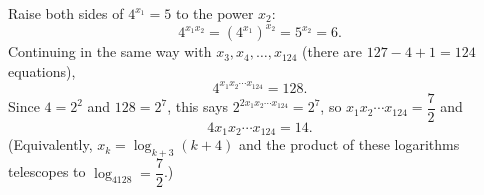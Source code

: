 Raise both sides of $4^{x_1}=5$ to the power $x_2$:
\[4^{x_1x_2}=\left(4^{x_1}\right)^{x_2}=5^{x_2}=6 .\]
Continuing in the same way with $x_3,x_4,\dots,x_{124}$ (there are $127-4+1=124$ equations),
\[4^{x_1x_2\cdots x_{124}}=128 .\]
Since $4=2^2$ and $128=2^7$, this says $2^{2x_1x_2\cdots x_{124}}=2^7$, so $x_1x_2\cdots x_{124}=\dfrac{7}{2}$ and
\[4x_1x_2\cdots x_{124}=\boxed{14}.\]
(Equivalently, $x_k=\log_{k+3}(k+4)$ and the product of these logarithms telescopes to $\log_4128=\dfrac{7}{2}$.)
